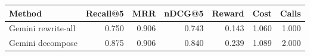 \begin{tabular}{lrrrrrr}
\toprule
Method & Recall@5 & MRR & nDCG@5 & Reward & Cost & Calls \\
\midrule
Gemini rewrite-all & 0.750 & 0.906 & 0.743 & 0.143 & 1.060 & 1.000 \\
Gemini decompose & 0.875 & 0.906 & 0.840 & 0.239 & 1.089 & 2.000 \\
\bottomrule
\end{tabular}
